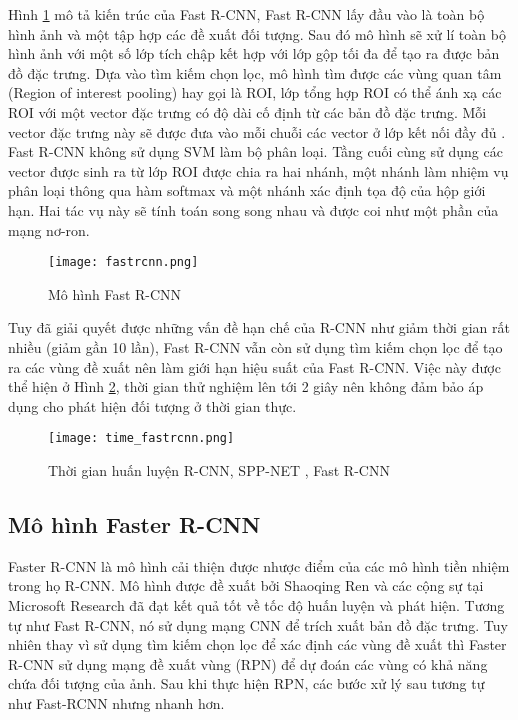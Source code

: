 \documentclass[../the.tex]{subfiles}
\begin{document}
\bigskip

{\fontsize{13}{12} \selectfont

	Hình \ref{fig:fastrcnn} mô tả kiến trúc của Fast R-CNN, Fast R-CNN lấy đầu vào là toàn bộ hình ảnh và một tập hợp các đề xuất đối tượng. Sau đó mô hình sẽ xử lí toàn bộ hình ảnh với một số lớp tích chập kết hợp với lớp gộp tối đa để tạo ra được bản đồ đặc trưng.
	Dựa vào tìm kiếm chọn lọc, mô hình tìm được các vùng quan tâm (Region of interest pooling) hay gọi là ROI, lớp tổng hợp ROI có thể ánh xạ các ROI với một vector đặc trưng có độ dài cố định từ các bản đồ đặc trưng. Mỗi vector đặc trưng này sẽ được đưa vào mỗi chuỗi các vector ở lớp kết nối đầy đủ \cite{girshick2015fast}.
	Fast R-CNN không sử dụng SVM làm bộ phân loại. Tầng cuối cùng sử dụng các vector được sinh ra từ lớp ROI được chia ra hai nhánh, một nhánh làm nhiệm vụ phân loại thông qua hàm softmax và một nhánh xác định tọa độ của hộp giới hạn. Hai tác vụ này sẽ tính toán song song nhau và được coi như một phần của mạng nơ-ron.

}

\begin{figure}[H]
	\centering
	\texttt{[image: fastrcnn.png]}
	\caption{Mô hình Fast R-CNN \cite{girshick2015fast}}
	\label{fig:fastrcnn}
\end{figure}

\bigskip

{\fontsize{13}{12} \selectfont

	Tuy đã giải quyết được những vấn đề hạn chế của R-CNN như giảm thời gian rất nhiều (giảm gần 10 lần), Fast R-CNN vẫn còn sử dụng tìm kiếm chọn lọc để tạo ra các vùng đề xuất nên làm giới hạn hiệu suất của Fast R-CNN. Việc này được thể hiện ở Hình \ref{fig:timefastrcnn},
	thời gian thử nghiệm lên tới 2 giây nên không đảm bảo áp dụng cho phát hiện đối tượng ở thời gian thực.

}

\begin{figure}[H]
	\centering
	\texttt{[image: time\_fastrcnn.png]}
	\caption{Thời gian huấn luyện R-CNN, SPP-NET \cite{He_2014}, Fast R-CNN \cite{testtimefastrcnn}}
	\label{fig:timefastrcnn}
\end{figure}

\subsection{Mô hình Faster R-CNN}

{\fontsize{13}{12} \selectfont

	Faster R-CNN là mô hình cải thiện được nhược điểm của các mô hình tiền nhiệm trong họ R-CNN. Mô hình được đề xuất bởi
	Shaoqing Ren và các cộng sự tại Microsoft Research \cite{ren2016faster} đã
	đạt kết quả tốt về tốc độ huấn luyện và phát hiện. Tương tự như Fast R-CNN, nó sử dụng mạng CNN để trích xuất bản đồ đặc trưng.
	Tuy nhiên thay vì sử dụng tìm kiếm chọn lọc để xác định các vùng đề xuất thì Faster R-CNN sử dụng mạng đề xuất vùng (RPN) để dự đoán các vùng có khả năng chứa đối tượng của ảnh.
	Sau khi thực hiện RPN, các bước xử lý sau tương tự như Fast-RCNN nhưng nhanh hơn.

}
\end{document}
